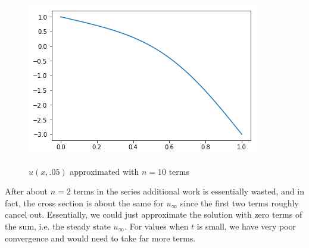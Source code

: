 \documentclass[12pt]{article}
\begin{document}
\begin{figure}[H]
	\caption{$u(x,.05)$ approximated with $n=10$ terms}
	\includegraphics[width=.5\textwidth]{tk01_figure_4}
	\label{fig2}
	\centering
\end{figure}

After about $n=2$ terms in the series additional work is essentially wasted, and in fact, the cross section is about the same for $u_\infty$ since the first two terms roughly cancel out. Essentially, we could just approximate the solution with zero terms of the sum, i.e. the steady state $u_\infty$. For values when $t$ is small, we have very poor convergence and would need to take far more terms.
\end{document}
